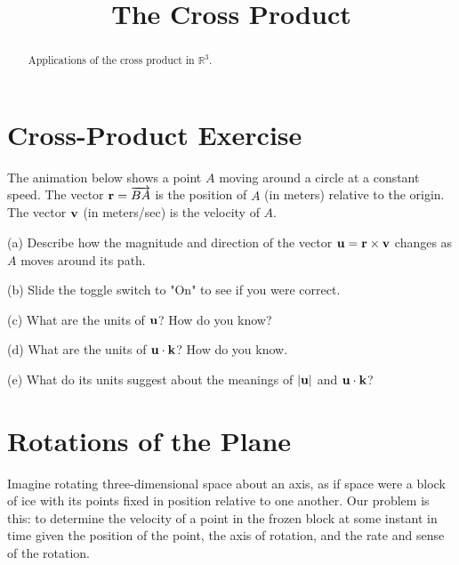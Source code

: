 \documentclass{ximera}
\title{The Cross Product}
\begin{document}
\begin{abstract}
Applications of the cross product in $\mathbb{R}^3$.
\end{abstract}
\maketitle


\section{Cross-Product Exercise}
The animation below shows a point $A$ moving around a circle at a constant speed. The vector ${\bf r} = \overrightarrow{BA}$ is the position of $A$ (in meters) relative to the origin. The vector ${\bf v}$ (in meters/sec) is the velocity of $A$. 

(a) Describe how the magnitude and direction of the vector ${\bf u} = {\bf r}\times {\bf v}$ changes as $A$ moves around its path.

(b) Slide the toggle switch to "On" to see if you were correct.

(c) What are the units of ${\bf u}$? How do you know?

(d) What are the units of ${\bf u} \cdot {\bf k}$? How do you know.

(e) What do its units suggest about the meanings of $|{\bf u}|$ and ${\bf u} \cdot {\bf k}$?


\begin{exploration}   \label{Exsd67g:Cross}
 
\begin{onlineOnly}
    \begin{center}
\end{center}
\end{onlineOnly}

\end{exploration}

\section{Rotations of the Plane}

Imagine rotating three-dimensional space about an axis, as if space were a block of ice with its points fixed in position relative to one another. Our problem is this: to determine the velocity of a point in the frozen block at some instant in time given the position of the point, the axis of rotation, and the rate and sense of the rotation.
\end{document}
